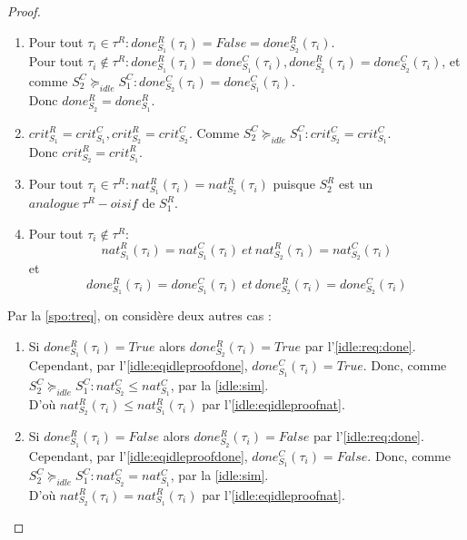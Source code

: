 \documentclass[12pt,a4paper,oneside]{book}
\theoremstyle{break}
\theoremstyle{breakplain}
\begin{document}
\begin{proof}
\begin{enumerate}
\item \label{idle:req:done} Pour tout $\tau_i \in \tau^R : done_{S_1}^R(\tau_i) = False = done_{S_2}^R(\tau_i)$.\\
Pour tout $\tau_i \notin \tau^R : done_{S_1}^R(\tau_i) = done_{S_1}^C(\tau_i), done_{S_2}^R(\tau_i) = done_{S_2}^C(\tau_i)$, et comme $S^C_2 \succeq_{idle} S^C_1 : done_{S_2}^C(\tau_i) = done_{S_1}^C(\tau_i)$.\\
Donc $done_{S_2}^R = done_{S_1}^R$.

\item $crit^R_{S_1} = crit^C_{S_1}, crit^R_{S_2} = crit^C_{S_2}$. Comme $S^C_2 \succeq_{idle} S^C_1 : crit^C_{S_2} = crit^C_{S_1}$.\\
Donc $crit^R_{S_2} = crit^R_{S_1}$.

\item Pour tout $\tau_i \in \tau^R : nat_{S_1}^R(\tau_i) = nat_{S_2}^R(\tau_i)$ puisque $S_2^R$ est un $analogue\ \tau^R-oisif$ de $S_1^R$.
\item Pour tout $\tau_i \notin \tau^R :$
\begin{equation}
\label{idle:eqidleproofnat}
nat_{S_1}^R(\tau_i) = nat_{S_1}^C(\tau_i)\ et\ nat_{S_2}^R(\tau_i) = nat_{S_2}^C(\tau_i)
\end{equation}
et 
\begin{equation}
\label{idle:eqidleproofdone}
done_{S_1}^R(\tau_i) = done_{S_1}^C(\tau_i)\ et\ done_{S_2}^R(\tau_i) = done_{S_2}^C(\tau_i)
\end{equation}
\end{enumerate}
Par la \autoref{spo:treq}, on considère deux autres cas :
\begin{enumerate}[label=(\alph*)]
\item Si $done_{S_1}^R(\tau_i) = True$ alors $done_{S_2}^R(\tau_i) = True$ par l'\autoref{idle:req:done}. Cependant, par l'\autoref{idle:eqidleproofdone}, $done_{S_1}^C(\tau_i) = True$. Donc, comme $S^C_2 \succeq_{idle} S^C_1 : nat_{S_2}^C \leq nat_{S_1}^C$, par la \autoref{idle:sim}.\\
D'où $nat_{S_2}^R(\tau_i) \leq nat_{S_1}^R(\tau_i)$ par l'\autoref{idle:eqidleproofnat}.
\item Si $done_{S_1}^R(\tau_i) = False$ alors $done_{S_2}^R(\tau_i) = False$ par l'\autoref{idle:req:done}. Cependant, par l'\autoref{idle:eqidleproofdone}, $done_{S_1}^C(\tau_i) = False$. Donc, comme $S^C_2 \succeq_{idle} S^C_1 : nat_{S_2}^C = nat_{S_1}^C$, par la \autoref{idle:sim}.\\
D'où $nat_{S_2}^R(\tau_i) = nat_{S_1}^R(\tau_i)$ par l'\autoref{idle:eqidleproofnat}.\\
\end{enumerate}


\end{proof}
\end{document}
